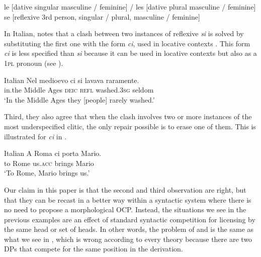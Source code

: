 \documentclass[output=paper,modfonts,nonflat,newtxmath,colorlinks,citecolor=brown]{langsci/langscibook}
\begin{document}
\ea%
    \label{ex:cabre:3}
    \ea le [dative singular masculine / feminine]  / les [dative   plural masculine / feminine]
    \ex se [reflexive 3rd person, singular / plural, masculine /   feminine]
    \z
    \z


In Italian, \citet{Pescarini2007} notes that a clash between two instances of reflexive \textit{si} is solved by substituting the first one with the form \textit{ci}, used in locative contexts . This form \textit{ci} is less specified than \textit{si} because it can be used in locative contexts but also as a \textsc{1pl} pronoun (see \citealt{Ferrazzano2003}).

\ea%
    \label{ex:cabre:4}
    Italian
    \ex
    \gll Nel medioevo  ci  si  lavava raramente. \\
    in.the {Middle Ages}  \textsc{deic} \textsc{refl}  washed.\textsc{3sg} seldom  \\
    \glt  ‘In the Middle Ages they [people] rarely washed.’
    \z
    \z

Third, they also agree that when the clash involves two or more instances of the most underspecified clitic, the only repair possible is to erase one of them. This is illustrated for \textit{ci} in .

\ea%
    \label{ex:cabre:5}
    Italian
    \ex
    \gll A Roma   ci  porta   Mario.  \\
    to Rome  us.\textsc{acc}  brings  Mario \\
    \glt  ‘To Rome, Mario brings us.’
    \z
    \z

Our claim in this paper is that the second and third observation are right, but that they can be recast in a better way within a syntactic system where there is no need to propose a morphological OCP. Instead, the situations we see in the previous examples are an effect of standard syntactic competition for licensing by the same head or set of heads. In other words, the problem of  and  is the same as what we see in , which is wrong according to every theory because there are two DPs that compete for the same position in the derivation.
\end{document}
